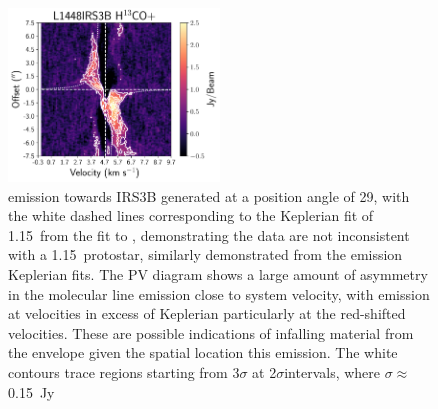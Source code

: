 \begin{figure}[H]
\begin{center}
\includegraphics[width=0.5\textwidth]{img/PV-Diagram_L1448IRS3B_H13COp_image_taper1500k.pdf}
\end{center}
\caption{\htcop\space emission towards IRS3B generated at a position angle of 29\deg, with the white dashed lines corresponding to the Keplerian fit of 1.15~\solm\space from the fit to \cso, demonstrating the data are not inconsistent with a 1.15~\solm\space protostar, similarly demonstrated from the \cso\space emission Keplerian fits. The PV diagram shows a large amount of asymmetry in the molecular line emission close to system velocity, with emission  at velocities in  excess of Keplerian particularly at the red-shifted velocities. These are possible indications of infalling material from the envelope given the spatial location this emission. The white contours trace regions starting from 3$\sigma$ at 2$\sigma$\space intervals, where $\sigma\approx$0.15~Jy}\label{fig:l1448irs3b_h13cop_pv}
\end{figure}






